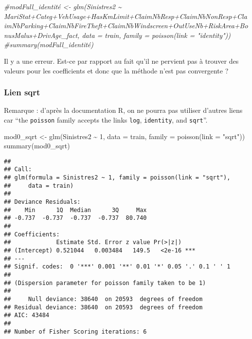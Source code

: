\documentclass[
]{article}
\newenvironment{Shaded}{\begin{snugshade}}{\end{snugshade}}
\newcommand{\AttributeTok}[1]{\textcolor[rgb]{0.77,0.63,0.00}{#1}}
\newcommand{\CommentTok}[1]{\textcolor[rgb]{0.56,0.35,0.01}{\textit{#1}}}
\newcommand{\DecValTok}[1]{\textcolor[rgb]{0.00,0.00,0.81}{#1}}
\newcommand{\FunctionTok}[1]{\textcolor[rgb]{0.00,0.00,0.00}{#1}}
\newcommand{\NormalTok}[1]{#1}
\newcommand{\OtherTok}[1]{\textcolor[rgb]{0.56,0.35,0.01}{#1}}
\newcommand{\SpecialCharTok}[1]{\textcolor[rgb]{0.00,0.00,0.00}{#1}}
\newcommand{\StringTok}[1]{\textcolor[rgb]{0.31,0.60,0.02}{#1}}
\begin{document}
\begin{Shaded}
\begin{Highlighting}[]
\CommentTok{\#modFull\_identité \textless{}{-} glm(Sinistres2 \textasciitilde{} MariStat+Categ+VehUsage+HasKmLimit+ClaimNbResp+ClaimNbNonResp+ClaimNbParking+ClaimNbFireTheft+ClaimNbWindscreen+OutUseNb+RiskArea+BonusMalus+DrivAge\_fact, data = train, family = poisson(link = "identity"))}
\CommentTok{\#summary(modFull\_identité)}
\end{Highlighting}
\end{Shaded}

Il y a une erreur. Est-ce par rapport au fait qu'il ne pervient pas à
trouver des valeurs pour les coefficients et donc que la méthode n'est
pas convergente ?

\hypertarget{lien-sqrt}{%
\subsubsection{Lien sqrt}\label{lien-sqrt}}

Remarque : d'après la documentation R, on ne pourra pas utiliser
d'autres liens car ``the \texttt{poisson} family accepts the links
\texttt{log}, \texttt{identity}, and \texttt{sqrt}''.

\begin{Shaded}
\begin{Highlighting}[]
\NormalTok{mod0\_sqrt }\OtherTok{\textless{}{-}} \FunctionTok{glm}\NormalTok{(Sinistres2 }\SpecialCharTok{\textasciitilde{}} \DecValTok{1}\NormalTok{, }\AttributeTok{data =}\NormalTok{ train, }\AttributeTok{family =} \FunctionTok{poisson}\NormalTok{(}\AttributeTok{link =} \StringTok{"sqrt"}\NormalTok{))}
\FunctionTok{summary}\NormalTok{(mod0\_sqrt)}
\end{Highlighting}
\end{Shaded}

\begin{verbatim}
## 
## Call:
## glm(formula = Sinistres2 ~ 1, family = poisson(link = "sqrt"), 
##     data = train)
## 
## Deviance Residuals: 
##    Min      1Q  Median      3Q     Max  
## -0.737  -0.737  -0.737  -0.737  80.740  
## 
## Coefficients:
##             Estimate Std. Error z value Pr(>|z|)    
## (Intercept) 0.521044   0.003484   149.5   <2e-16 ***
## ---
## Signif. codes:  0 '***' 0.001 '**' 0.01 '*' 0.05 '.' 0.1 ' ' 1
## 
## (Dispersion parameter for poisson family taken to be 1)
## 
##     Null deviance: 38640  on 20593  degrees of freedom
## Residual deviance: 38640  on 20593  degrees of freedom
## AIC: 43484
## 
## Number of Fisher Scoring iterations: 6
\end{verbatim}
\end{document}
